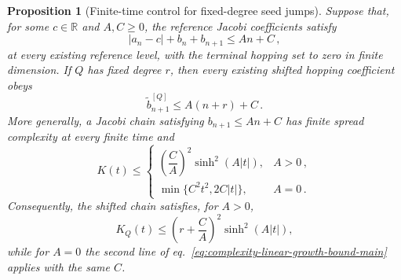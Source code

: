 \documentclass[a4paper,11pt]{article}
\newtheorem{proposition}{Proposition}[section]
\theoremstyle{definition}
\theoremstyle{remark}
\newcommand{\RR}{\mathbb R}
\begin{document}
\begin{proposition}[Finite-time control for fixed-degree seed jumps]
\label{prop:finite-time-control-main}
Suppose that, for some $c\in\RR$ and $A,C\ge0$, the reference Jacobi
coefficients satisfy
\begin{equation}
   |a_n-c|+b_n+b_{n+1}\le An+C\,,
   \label{eq:reference-linear-bound-main}
\end{equation}
at every existing reference level, with the terminal hopping set to zero
in finite dimension.  If $Q$ has fixed degree $r$, then every existing
shifted hopping coefficient obeys
\begin{equation}
   \widetilde b_{n+1}^{[Q]}\le A(n+r)+C\,.
   \label{eq:shifted-linear-bound-main}
\end{equation}
More generally, a Jacobi chain satisfying $b_{n+1}\le An+C$ has finite
spread complexity at every finite time and
\begin{equation}
   K(t)\le
   \begin{cases}
   \left(\dfrac{C}{A}\right)^2\sinh^2(A|t|),&A>0\,,\\[3mm]
   \min\{C^2t^2,2C|t|\},&A=0\,.
   \end{cases}
   \label{eq:complexity-linear-growth-bound-main}
\end{equation}
Consequently, the shifted chain satisfies, for $A>0$,
\begin{equation}
   K_Q(t)\le
   \left(r+\frac{C}{A}\right)^2\sinh^2(A|t|),
   \label{eq:shifted-complexity-linear-growth-bound-main}
\end{equation}
while for $A=0$ the second line of
eq.~\eqref{eq:complexity-linear-growth-bound-main} applies with the same
$C$.
\end{proposition}
\end{document}
